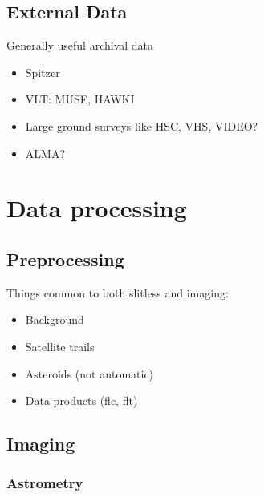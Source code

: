 \documentclass[twocolumn]{aastex63}
\begin{document}
\subsection{External Data}
\label{s:external}

Generally useful archival data

\begin{itemize}
    \item Spitzer 
    \item VLT: MUSE, HAWKI
    \item Large ground surveys like HSC, VHS, VIDEO?
    \item ALMA?
\end{itemize}

\section{Data processing}
\label{s:procesing}

\subsection{Preprocessing}
\label{s:preprocessing}

Things common to both slitless and imaging: 
\begin{itemize}
    \item Background
    \item Satellite trails
    \item Asteroids (not automatic)
    \item Data products (flc, flt)
\end{itemize}

\subsection{Imaging}
\label{s:process_imaging}

\subsubsection{Astrometry}
\label{s:astrometry}
\end{document}
